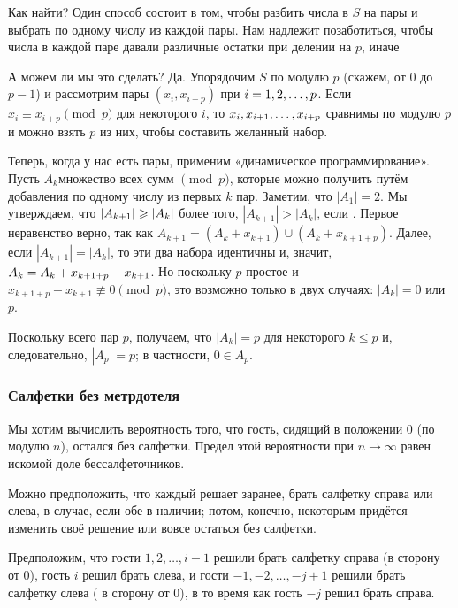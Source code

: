 \documentclass[twoside]{book}
\begin{document}
Как  найти?
Один способ состоит в том, чтобы разбить числа в $S$ на пары и выбрать по одному числу из каждой пары.
Нам  надлежит позаботиться, чтобы числа в каждой паре давали различные остатки при делении на $p$, иначе 

А можем ли мы это сделать? Да.
Упорядочим $S$ по модулю $p$ (скажем, от $0$ до $p-1$) и рассмотрим пары $(x_i,x_{i+p})$ при $i\z=1,2,\dots, p$.
Если $x_i\equiv x_{i+p}\pmod p$ для некоторого $i$, то $x_i,x_{i+1},\z\dots,x_{i+p}$ сравнимы по модулю $p$ и можно взять $p$ из них, чтобы составить желанный набор.

Теперь, когда у нас есть пары, применим «динамическое программирование».
Пусть $A_k$множество всех сумм $\pmod p$, которые можно получить путём добавления по одному числу из первых $k$ пар.
Заметим, что $|A_1|= 2$.
Мы утверждаем, что $|A_{k+1}|\z\ge|A_k|$ более того, $|A_{k+1}|>|A_k|$, если .
Первое неравенство верно, так как $A_{k+1} = (A_k+x_{k+1}) \cup (A_k+x_{k+1+p})$.
Далее, если $|A_{k+1}|=|A_k|$, то эти два набора идентичны и, значит,  $A_k \z= A_k+x_{k+1+p}-x_{k+1}$.
Но поскольку $p$ простое и $x_{k+1+p}-x_{k+1}\not\equiv 0\pmod p$, это возможно только в двух случаях: $|A_k|= 0$ или $p$.

Поскольку всего пар $p$, получаем, что $|A_k|= p$ для некоторого $k \le p$ и, следовательно, $|A_p|= p$; в частности, $0\in A_p$. \heart

\subsubsection*{Салфетки без метрдотеля}

Мы хотим вычислить вероятность того, что гость, сидящий в положении 0 (по модулю $n$), остался без салфетки.
Предел этой вероятности при $n\to\infty$ равен искомой доле бессалфеточников.

Можно предположить, что каждый решает заранее, брать салфетку справа или слева, в случае, если обе в наличии;
потом, конечно, некоторым придётся изменить своё решение или вовсе остаться без салфетки.

Предположим, что гости $1,2,\dots, i - 1$ решили брать салфетку справа  (в сторону от 0),  гость $i$ решил брать слева,
и  гости $-1,-2,\dots, -j + 1$  решили брать салфетку слева ( в сторону от 0), в то время как гость $-j$ решил брать справа.
\end{document}
